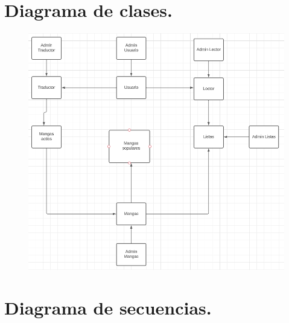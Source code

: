 \documentclass[12pt]{article}
\begin{document}
\newpage

\section{Diagrama de clases.}

\begin{figure}[htbp]
	\centering
		\includegraphics[width=1.00\textwidth]{Screenshot 2023-10-05 114350.png}
	\label{fig:Screenshot 2023-10-05 114350}
\end{figure}

\newpage

\section{Diagrama de secuencias.}
\end{document}
